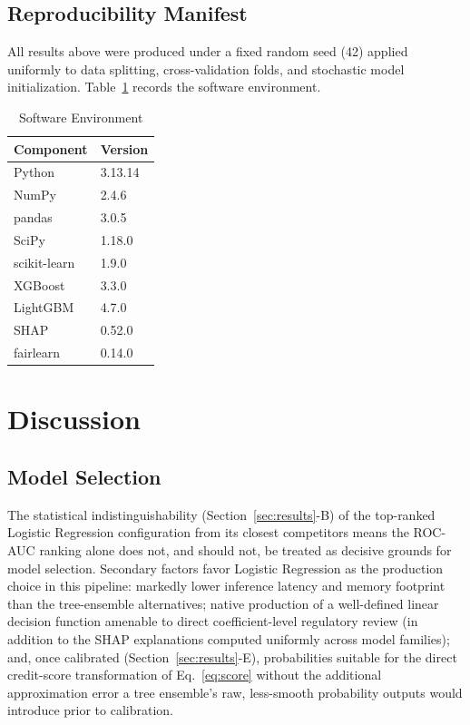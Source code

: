\documentclass[journal]{IEEEtran}
\begin{document}
\subsection{Reproducibility Manifest}

All results above were produced under a fixed random seed (42) applied uniformly to data splitting, cross-validation folds, and stochastic model initialization. Table~\ref{tab:env} records the software environment.

\begin{table}[!t]
\caption{Software Environment}
\label{tab:env}
\centering
\begin{tabular}{ll}
\toprule
Component & Version \\
\midrule
Python & 3.13.14 \\
NumPy & 2.4.6 \\
pandas & 3.0.5 \\
SciPy & 1.18.0 \\
scikit-learn & 1.9.0 \\
XGBoost & 3.3.0 \\
LightGBM & 4.7.0 \\
SHAP & 0.52.0 \\
fairlearn & 0.14.0 \\
\bottomrule
\end{tabular}
\end{table}

\section{Discussion}
\label{sec:discussion}

\subsection{Model Selection}

The statistical indistinguishability (Section~\ref{sec:results}-B) of the top-ranked Logistic Regression configuration from its closest competitors means the ROC-AUC ranking alone does not, and should not, be treated as decisive grounds for model selection. Secondary factors favor Logistic Regression as the production choice in this pipeline: markedly lower inference latency and memory footprint than the tree-ensemble alternatives; native production of a well-defined linear decision function amenable to direct coefficient-level regulatory review (in addition to the SHAP explanations computed uniformly across model families); and, once calibrated (Section~\ref{sec:results}-E), probabilities suitable for the direct credit-score transformation of Eq.~\ref{eq:score} without the additional approximation error a tree ensemble's raw, less-smooth probability outputs would introduce prior to calibration.
\end{document}
